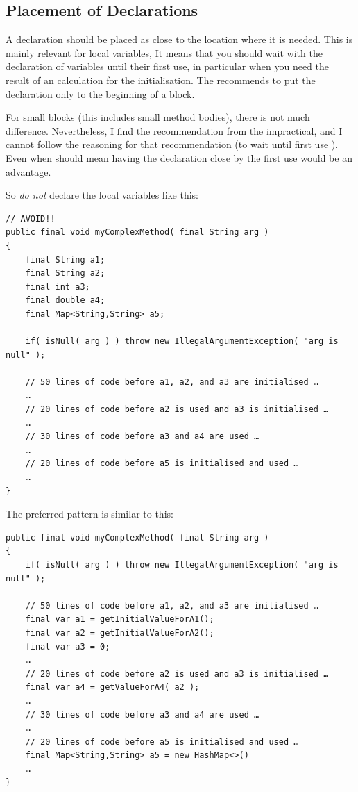 \subsection{Placement of Declarations}

A declaration should be placed as close to the location where it is needed. This is mainly relevant for local variables, It means that you should wait with the declaration of variables until their first use, in particular when you need the result of an calculation for the initialisation. The  \autocite{SUN_CODE_CONVENTIONS:Placement} recommends to put the declaration only to the beginning of a block.

For small blocks (this includes small method bodies), there is not much difference. Nevertheless, I find the recommendation from the  impractical, and I cannot follow the reasoning for that recommendation (to wait until first use ). Even when  should mean  having the declaration close by the first use would be an advantage.

So \textit{do not} declare the local variables like this:
\begin{lstlisting}
// AVOID!!
public final void myComplexMethod( final String arg )
{
    final String a1;
    final String a2;
    final int a3;
    final double a4;
    final Map<String,String> a5;

    if( isNull( arg ) ) throw new IllegalArgumentException( "arg is null" );

    // 50 lines of code before a1, a2, and a3 are initialised …
    …
    // 20 lines of code before a2 is used and a3 is initialised …
    …
    // 30 lines of code before a3 and a4 are used …
    …
    // 20 lines of code before a5 is initialised and used …
    …
}
\end{lstlisting}

The preferred pattern is similar to this:
\begin{lstlisting}
public final void myComplexMethod( final String arg )
{
    if( isNull( arg ) ) throw new IllegalArgumentException( "arg is null" );

    // 50 lines of code before a1, a2, and a3 are initialised …
    final var a1 = getInitialValueForA1();
    final var a2 = getInitialValueForA2();
    final var a3 = 0;
    …
    // 20 lines of code before a2 is used and a3 is initialised …
    final var a4 = getValueForA4( a2 );
    …
    // 30 lines of code before a3 and a4 are used …
    …
    // 20 lines of code before a5 is initialised and used …
    final Map<String,String> a5 = new HashMap<>()
    …
}
\end{lstlisting}


